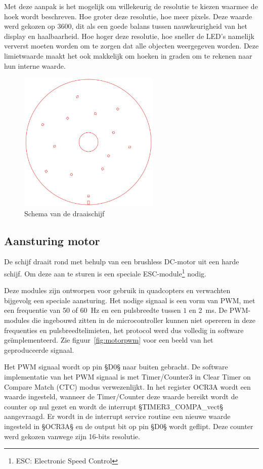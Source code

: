 \documentclass[12pt]{ugentreport}
\begin{document}
Met deze aanpak is het mogelijk om willekeurig de resolutie te kiezen
waarmee de hoek wordt beschreven. Hoe groter deze resolutie,
hoe meer pixels. Deze waarde werd gekozen op \num{3600}, dit als een goede balans
tussen nauwkeurigheid van het display en haalbaarheid. Hoe hoger deze resolutie,
hoe sneller de LED's namelijk ververst moeten worden om te zorgen dat alle
objecten weergegeven worden. Deze limietwaarde maakt het ook makkelijk om hoeken
in graden om te rekenen naar hun interne waarde.

\begin{figure}
  \centering
  \includegraphics[width=0.6\textwidth]{img/schijf.jpg}
  \caption{Schema van de draaischijf}
  \label{fig:schijf}
\end{figure}

\subsection{Aansturing motor}
De schijf draait rond met behulp van een brushless DC-motor uit een harde schijf.
Om deze aan te sturen is een speciale ESC-module\footnote{ESC: Electronic Speed Control} nodig.

Deze modules zijn ontworpen voor gebruik in quadcopters en verwachten bijgevolg
een speciale aansturing.
Het nodige signaal is een vorm van PWM, met een frequentie van 50 of
\SI{60}{\hertz}
en een pulsbreedte tussen $1$ en \SI{2}{\milli\second}.
De PWM-modules die ingebouwd zitten in de microcontroller kunnen niet opereren
in deze frequenties en pulsbreedtelimieten,
het protocol werd dus volledig in software geïmplementeerd.
Zie figuur~\ref{fig:motorpwm} voor een beeld van het geproduceerde signaal.

Het PWM signaal wordt op pin §D0§ naar buiten gebracht. De software implementatie
van het PWM signaal is met Timer/Counter3 in Clear Timer on Compare Match (CTC)
modus verwezenlijkt. In het register OCR3A wordt een waarde ingesteld, wanneer de Timer/Counter
deze waarde bereikt wordt de counter op nul gezet en wordt de interrupt §TIMER3_COMPA_vect§
aangevraagd. Er wordt in de interrupt service routine een nieuwe waarde ingesteld
in §OCR3A§ en de output bit op pin §D0§ wordt geflipt. Deze counter werd gekozen
vanwege zijn 16-bits resolutie.
\end{document}
